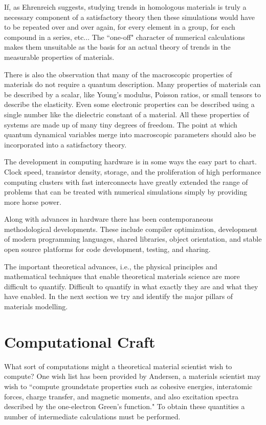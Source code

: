 If, as Ehrenreich suggests, studying trends in homologous materials is truly a necessary component of a satisfactory
theory then these simulations would have to be repeated over and over again, for every element in a group,
for each compound in a series, etc... The ``one-off" character of numerical calculations makes them unsuitable
as the basis for an actual theory of trends in the measurable properties of materials.

There is also the observation that many of the macroscopic properties of materials do not require a quantum description.
Many properties of materials can be described by a scalar, like Young's modulus, Poisson ratios, 
or small tensors to describe the elasticity. Even some electronic properties 
can be described using a single number like the dielectric constant of a material.
All these properties of systems are made up of many tiny degrees of freedom.
The point at which quantum dynamical variables merge into macroscopic parameters 
should also be incorporated into a satisfactory theory.

The development in computing hardware is in some ways the easy part to chart. 
Clock speed, transistor density, storage, and the proliferation of high 
performance computing clusters with fast interconnects have greatly extended 
the range of problems that can be treated with numerical simulations
simply by providing more horse power.

Along with advances in hardware there has been contemporaneous methodological developments.
These include compiler optimization, development of modern programming languages, 
shared libraries, object orientation, and stable open source platforms for 
code development, testing, and sharing. 

The important theoretical advances, i.e., the physical principles and
mathematical techniques that enable theoretical materials science 
are more difficult to quantify. Difficult to quantify in what exactly 
they are and what they have enabled. In the next section 
we try and identify the major pillars of materials modelling.

\section{Computational Craft}
What sort of computations might a theoretical material scientist
wish to compute? One wish list has been provided by Andersen, a materials scientist
may wish to ``compute groundstate properties such as cohesive energies, interatomic forces, 
charge transfer, and magnetic moments, and also excitation spectra described 
by the one-electron Green's function."\cite{anderson75} To obtain these quantities a
number of intermediate calculations must be performed.

